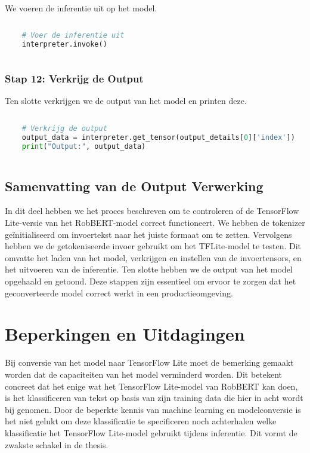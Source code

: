 We voeren de inferentie uit op het model.

\begin{lstlisting}[language=Python, caption={Voer de inferentie uit}]
    
    # Voer de inferentie uit
    interpreter.invoke()
    
\end{lstlisting}

\subsubsection{Stap 12: Verkrijg de Output}

Ten slotte verkrijgen we de output van het model en printen deze.

\begin{lstlisting}[language=Python, caption={Verkrijg de output}]
    
    # Verkrijg de output
    output_data = interpreter.get_tensor(output_details[0]['index'])
    print("Output:", output_data)
    
\end{lstlisting}

\subsection{Samenvatting van de Output Verwerking}

In dit deel hebben we het proces beschreven om te controleren of de TensorFlow Lite-versie van het RobBERT-model correct functioneert. We hebben de tokenizer geïnitialiseerd om invoertekst naar het juiste formaat om te zetten. Vervolgens hebben we de getokeniseerde invoer gebruikt om het TFLite-model te testen. Dit omvatte het laden van het model, verkrijgen en instellen van de invoertensors, en het uitvoeren van de inferentie. Ten slotte hebben we de output van het model opgehaald en getoond. Deze stappen zijn essentieel om ervoor te zorgen dat het geconverteerde model correct werkt in een productieomgeving.

\section{Beperkingen en Uitdagingen}

Bij conversie van het model naar TensorFlow Lite moet de bemerking gemaakt worden dat de capaciteiten van het model verminderd worden. Dit betekent concreet dat het enige wat het TensorFlow Lite-model van RobBERT kan doen, is het klassificeren van tekst op basis van zijn training data die hier in acht wordt bij genomen. Door de beperkte kennis van machine learning en modelconversie is het niet gelukt om deze klassificatie te specificeren noch achterhalen welke klassificatie het TensorFlow Lite-model gebruikt tijdens inferentie. Dit vormt de zwakste schakel in de thesis.

